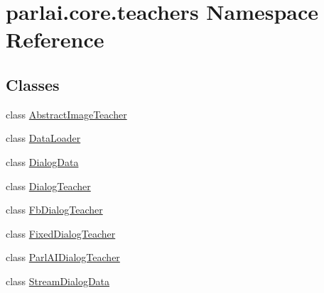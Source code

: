 \hypertarget{namespaceparlai_1_1core_1_1teachers}{}\section{parlai.\+core.\+teachers Namespace Reference}
\label{namespaceparlai_1_1core_1_1teachers}
\subsection*{Classes}
\begin{DoxyCompactItemize}
\item 
class \hyperlink{classparlai_1_1core_1_1teachers_1_1AbstractImageTeacher}{Abstract\+Image\+Teacher}
\item 
class \hyperlink{classparlai_1_1core_1_1teachers_1_1DataLoader}{Data\+Loader}
\item 
class \hyperlink{classparlai_1_1core_1_1teachers_1_1DialogData}{Dialog\+Data}
\item 
class \hyperlink{classparlai_1_1core_1_1teachers_1_1DialogTeacher}{Dialog\+Teacher}
\item 
class \hyperlink{classparlai_1_1core_1_1teachers_1_1FbDialogTeacher}{Fb\+Dialog\+Teacher}
\item 
class \hyperlink{classparlai_1_1core_1_1teachers_1_1FixedDialogTeacher}{Fixed\+Dialog\+Teacher}
\item 
class \hyperlink{classparlai_1_1core_1_1teachers_1_1ParlAIDialogTeacher}{Parl\+A\+I\+Dialog\+Teacher}
\item 
class \hyperlink{classparlai_1_1core_1_1teachers_1_1StreamDialogData}{Stream\+Dialog\+Data}
\end{DoxyCompactItemize}
